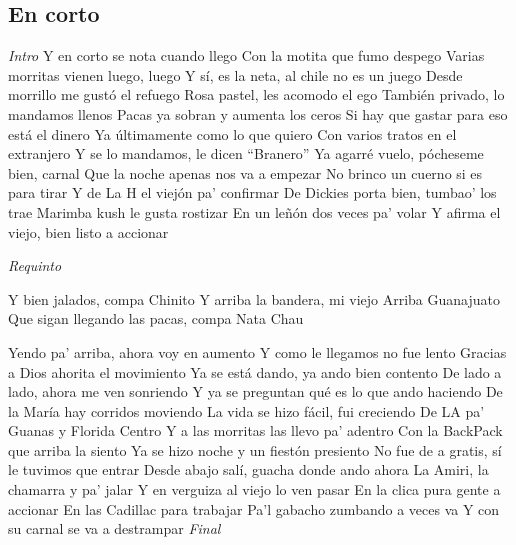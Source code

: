 \subsection{En corto}
\noindent

\vspace{1cm}

\begin{guitar}
	\begin{multicols}{2}
		\textit{Intro}
	Y en corto se nota cuando llego
	Con la motita que fumo despego
	Varias morritas vienen luego, luego
	Y sí, es la neta, al chile no es un juego
	Desde morrillo me gustó el refuego
	Rosa pastel, les acomodo el ego
	También privado, lo mandamos llenos
	Pacas ya sobran y aumenta los ceros
	Si hay que gastar para eso está el dinero
	Ya últimamente como lo que quiero
	Con varios tratos en el extranjero
	Y se lo mandamos, le dicen ``Branero''
	Ya agarré vuelo, pócheseme bien, carnal
	Que la noche apenas nos va a empezar
	No brinco un cuerno si es para tirar
	Y de La H el viejón pa' confirmar
	De Dickies porta bien, tumbao' los trae
	Marimba kush le gusta rostizar
	En un leñón dos veces pa' volar
	Y afirma el viejo, bien listo a accionar
	\par
	\textit{Requinto}
	\par
	Y bien jalados, compa Chinito
	Y arriba la bandera, mi viejo
	Arriba Guanajuato
	Que sigan llegando las pacas, compa Nata
	Chau
	\par
	Yendo pa' arriba, ahora voy en aumento
	Y como le llegamos no fue lento
	Gracias a Dios ahorita el movimiento
	Ya se está dando, ya ando bien contento
	De lado a lado, ahora me ven sonriendo
	Y ya se preguntan qué es lo que ando haciendo
	De la María hay corridos moviendo
	La vida se hizo fácil, fui creciendo
	De LA pa' Guanas y Florida Centro
	Y a las morritas las llevo pa' adentro
	Con la BackPack que arriba la siento
	Ya se hizo noche y un fiestón presiento
	No fue de a gratis, sí le tuvimos que entrar
	Desde abajo salí, guacha donde ando ahora
	La Amiri, la chamarra y pa' jalar
	Y en verguiza al viejo lo ven pasar
	En la clica pura gente a accionar
	En las Cadillac para trabajar
	Pa'l gabacho zumbando a veces va
	Y con su carnal se va a destrampar
		\textit{Final}
	\end{multicols}
\end{guitar}
